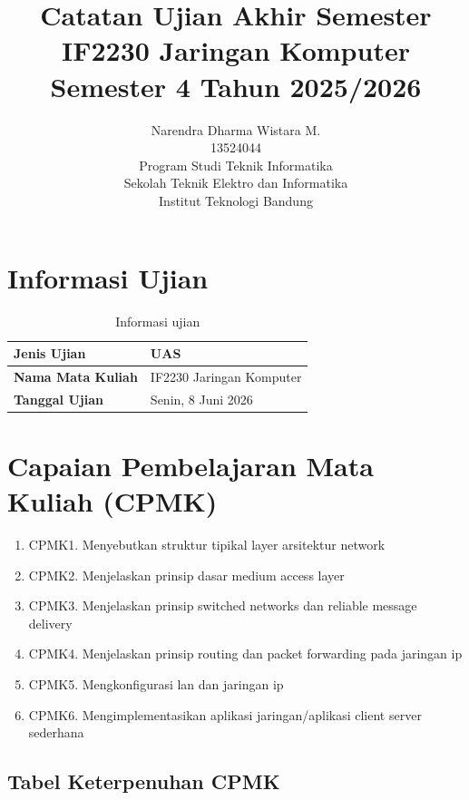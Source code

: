 \documentclass[11pt,a4paper]{article}
\title{%
    \vspace{-2cm}
    \textbf{\LARGE Catatan Ujian Akhir Semester} \\[0.25em]
    \Large IF2230 Jaringan Komputer \\[0.25em]
    \normalsize Semester 4 Tahun 2025/2026 \\[2em]
}
\author{%
    Narendra Dharma Wistara M. \\[0.25em]
    13524044 \\[2.5em]
    Program Studi Teknik Informatika \\[0.25em]
    Sekolah Teknik Elektro dan Informatika \\[0.25em]
    Institut Teknologi Bandung \\[0.25em]
}
\begin{document}
\begin{titlepage}
    \maketitle
    \thispagestyle{empty}
\end{titlepage}

\clearpage

\tableofcontents

\clearpage
{}

\section{Informasi Ujian}

\begin{table}[H]
\centering
\begin{tabularx}{\textwidth}{|L{0.30\textwidth}|X|}
\hline
\textbf{Jenis Ujian} & UAS \\
\hline
\textbf{Nama Mata Kuliah} & IF2230 Jaringan Komputer \\
\hline
\textbf{Tanggal Ujian} & Senin, 8 Juni 2026 \\
\hline
\end{tabularx}
\caption{Informasi ujian}
\label{tab:informasi-ujian}
\end{table}

\section{Capaian Pembelajaran Mata Kuliah (CPMK)}

\begin{enumerate}
    \item CPMK1. Menyebutkan struktur tipikal layer arsitektur network
    \item CPMK2. Menjelaskan prinsip dasar medium access layer
    \item CPMK3. Menjelaskan prinsip switched networks dan reliable message delivery
    \item CPMK4. Menjelaskan prinsip routing dan packet forwarding pada jaringan ip
    \item CPMK5. Mengkonfigurasi lan dan jaringan ip
    \item CPMK6. Mengimplementasikan aplikasi jaringan/aplikasi client server sederhana
\end{enumerate}

\subsection{Tabel Keterpenuhan CPMK}
\end{document}
